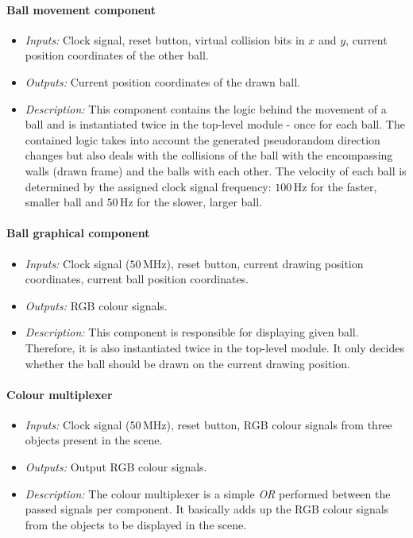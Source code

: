 \documentclass[11pt,a4paper]{article}
\def\MHz{\,\mathrm{MHz}}
\def\Hz{\,\mathrm{Hz}}
\begin{document}
        \paragraph{Ball movement component}
        \begin{itemize}
            \item \emph{Inputs:} Clock signal, reset button, virtual collision bits in $x$ and $y$, current position coordinates of the other ball.
            \item \emph{Outputs:} Current position coordinates of the drawn ball.
            \item \emph{Description:} This component contains the logic behind the movement of a ball and is instantiated twice in the top-level module - once for each ball. The contained logic takes into account the generated pseudorandom direction changes but also deals with the collisions of the ball with the encompassing walls (drawn frame) and the balls with each other. The velocity of each ball is determined by the assigned clock signal frequency: $100\Hz$ for the faster, smaller ball and $50\Hz$ for the slower, larger ball.
        \end{itemize}

        \paragraph{Ball graphical component}
        \begin{itemize}
            \item \emph{Inputs:} Clock signal ($50\MHz$), reset button, current drawing position coordinates, current ball position coordinates.
            \item \emph{Outputs:} RGB colour signals.
            \item \emph{Description:} This component is responsible for displaying given ball. Therefore, it is also instantiated twice in the top-level module. It only decides whether the ball should be drawn on the current drawing position.
        \end{itemize}

        \paragraph{Colour multiplexer}
        \begin{itemize}
            \item \emph{Inputs:} Clock signal ($50\MHz$), reset button, RGB colour signals from three objects present in the scene.
            \item \emph{Outputs:} Output RGB colour signals.
            \item \emph{Description:} The colour multiplexer is a simple \emph{OR} performed between the passed signals per component. It basically adds up the RGB colour signals from the objects to be displayed in the scene.
        \end{itemize}
\end{document}
